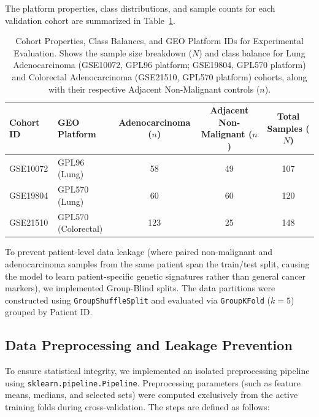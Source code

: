 \documentclass[journal,10pt]{IEEEtran}
\begin{document}
The platform properties, class distributions, and sample counts for each validation cohort are summarized in Table~\ref{tab:class_balance}.

\begin{table}[htbp]
\centering
\caption{Cohort Properties, Class Balances, and GEO Platform IDs for Experimental Evaluation. Shows the sample size breakdown ($N$) and class balance for Lung Adenocarcinoma (GSE10072, GPL96 platform; GSE19804, GPL570 platform) and Colorectal Adenocarcinoma (GSE21510, GPL570 platform) cohorts, along with their respective Adjacent Non-Malignant controls ($n$).}
\label{tab:class_balance}
\begin{tabular}{llccc}
\toprule
\textbf{Cohort ID} & \textbf{GEO Platform} & \textbf{Adenocarcinoma ($n$)} & \textbf{Adjacent Non-Malignant ($n$)} & \textbf{Total Samples ($N$)} \\
\midrule
GSE10072 & GPL96 (Lung) & 58 & 49 & 107 \\
GSE19804 & GPL570 (Lung) & 60 & 60 & 120 \\
GSE21510 & GPL570 (Colorectal) & 123 & 25 & 148 \\
\bottomrule
\end{tabular}
\end{table}

To prevent patient-level data leakage (where paired non-malignant and adenocarcinoma samples from the same patient span the train/test split, causing the model to learn patient-specific genetic signatures rather than general cancer markers), we implemented Group-Blind splits. The data partitions were constructed using \texttt{GroupShuffleSplit} and evaluated via \texttt{GroupKFold} ($k=5$) grouped by Patient ID.

\subsection{Data Preprocessing and Leakage Prevention}
To ensure statistical integrity, we implemented an isolated preprocessing pipeline using \texttt{sklearn.pipeline.Pipeline}. Preprocessing parameters (such as feature means, medians, and selected sets) were computed exclusively from the active training folds during cross-validation. The steps are defined as follows:
\end{document}
